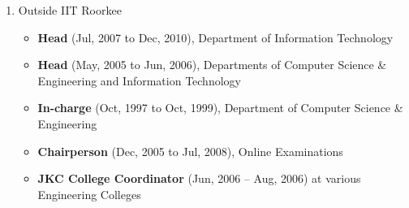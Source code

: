 \begin{enumerate}
\item
Outside IIT Roorkee

\begin{itemize}
\item
\textbf{Head} (Jul, 2007 to Dec, 2010), Department of Information Technology 

\item
\textbf{Head} (May, 2005 to Jun, 2006), Departments of Computer Science \& Engineering and Information Technology

\item
\textbf{In-charge} (Oct, 1997 to Oct, 1999), Department of Computer Science \& Engineering

\item
\textbf{Chairperson} (Dec, 2005 to Jul, 2008), Online Examinations

\item
\textbf{JKC College Coordinator} (Jun, 2006 – Aug, 2006) at various Engineering Colleges
\end{itemize}

	

\end{enumerate}